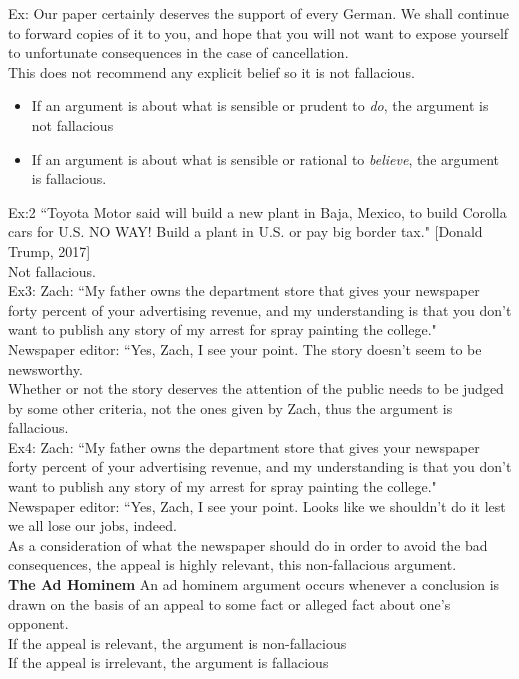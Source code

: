 Ex: Our paper certainly deserves the support of every German. We shall continue to forward copies of it to you, and hope that you will not want to expose yourself to unfortunate consequences in the case of cancellation.\\

This does not recommend any explicit belief so it is not fallacious.
\begin{itemize}
    \item If an argument is about what is sensible or prudent to \textit{do}, the argument is not fallacious
    \item If an argument is about what is sensible or rational to \textit{believe}, the argument is fallacious.
\end{itemize}

Ex:2 ``Toyota Motor said will build a new plant in Baja, Mexico, to build Corolla cars for U.S. NO WAY! Build a plant in U.S. or pay big border tax." [Donald Trump, 2017]\\
Not fallacious.\\

Ex3: Zach: ``My father owns the department store that gives your newspaper forty percent of your advertising revenue, and my understanding is that you don't want to publish any story of my arrest for spray painting the college."\\
Newspaper editor: ``Yes, Zach, I see your point. The story doesn't seem to be newsworthy.\\

Whether or not the story deserves the attention of the public needs to be judged by some other criteria, not the ones given by Zach, thus the argument is fallacious.\\

Ex4: Zach: ``My father owns the department store that gives your newspaper forty percent of your advertising revenue, and my understanding is that you don't want to publish any story of my arrest for spray painting the college."\\
Newspaper editor: ``Yes, Zach, I see your point. Looks like we shouldn't do it lest we all lose our jobs, indeed.\\

As a consideration of what the newspaper should do in order to avoid the bad consequences, the appeal is highly relevant, this non-fallacious argument.\\

\textbf{The Ad Hominem}
An ad hominem argument occurs whenever a conclusion is drawn on the basis of an appeal to some fact or alleged fact about one's opponent.\\
If the appeal is relevant, the argument is non-fallacious\\
If the appeal is irrelevant, the argument is fallacious\\

